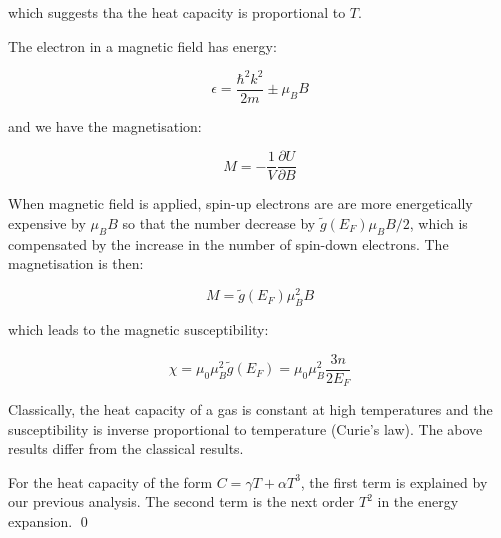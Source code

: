 \documentclass[12pt]{article}
\begin{document}
which suggests tha the heat capacity is proportional to $T$.

The electron in a magnetic field has energy:

\begin{equation}
    \epsilon = \frac{\hbar^{2}k^{2}}{2m} \pm \mu_{B} B
\end{equation}

and we have the magnetisation:

\begin{equation}
    M = -\frac{1}{V} \frac{\partial U}{\partial B}
\end{equation}

When magnetic field is applied, spin-up electrons are are more energetically expensive by $\mu_{B} B$ so that the number decrease by $\tilde{g}(E_{F}) \mu_{B} B/2$, which is compensated by the increase in the number of spin-down electrons. The magnetisation is then:

\begin{equation}
    M = \tilde{g}(E_{F}) \mu_{B}^{2} B
\end{equation}

which leads to the magnetic susceptibility:

\begin{equation}
    \chi = \mu_{0} \mu_{B}^{2} \tilde{g}(E_{F}) = \mu_{0} \mu_{B}^{2} \frac{3n}{2E_{F}}
\end{equation}

Classically, the heat capacity of a gas is constant at high temperatures and the susceptibility is inverse proportional to temperature (Curie's law). The above results differ from the classical results.

For the heat capacity of the form $C = \gamma T + \alpha T^{3}$, the first term is explained by our previous analysis. The second term is the next order $T^{2}$ in the energy expansion.
\qed
\end{document}
